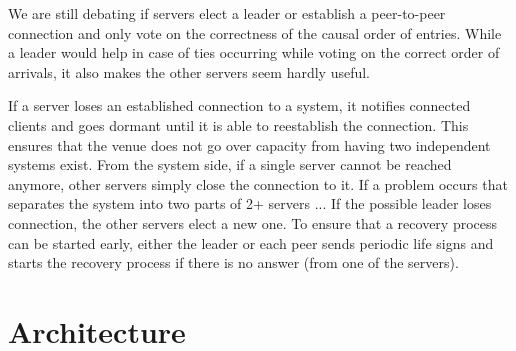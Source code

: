 \documentclass[runningheads]{llncs}
\begin{document}
We are still debating if servers elect a leader or establish a peer-to-peer connection and only vote on the correctness of the causal order of entries.
While a leader would help in case of ties occurring while voting on the correct order of arrivals, it also makes the other servers seem hardly useful.

If a server loses an established connection to a system, it notifies connected clients and goes dormant until it is able to reestablish the connection.
This ensures that the venue does not go over capacity from having two independent systems exist.
From the system side, if a single server cannot be reached anymore, other servers simply close the connection to it.
If a problem occurs that separates the system into two parts of 2+ servers ... %
If the possible leader loses connection, the other servers elect a new one.
To ensure that a recovery process can be started early, either the leader or each peer sends periodic life signs and starts the recovery process if there is no answer (from one of the servers).
\section{Architecture}
\end{document}
